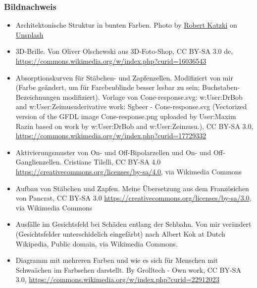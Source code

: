 \documentclass{beamer}
\begin{document}


\begin{frame}
\frametitle{Bildnachweis}
\begin{tiny}



 
\begin{itemize}

\item
Architektonische Struktur in bunten Farben. Photo by \href{https://unsplash.com/@ro_ka?utm_source=unsplash&utm_medium=referral&utm_content=creditCopyText}{Robert Katzki} on \href{https://unsplash.com/?utm_source=unsplash&utm_medium=referral&utm_content=creditCopyText}{Unsplash}
  

\item
3D-Brille. Von Oliver Olschewski aus 3D-Foto-Shop, CC BY-SA 3.0 de, \url{https://commons.wikimedia.org/w/index.php?curid=16036543}

\item
Absorptionskurven für Stäbchen- und Zapfenzellen. Modifiziert von mir (Farbe geändert, um für Farebenblinde besser lesbar zu sein; Buchstaben-Bezeichnungen modifiziert). Vorlage von Cone-response.svg: w:User:DrBob and w:User:Zeimusuderivative work: Sgbeer - Cone-response.svg (Vectorized version of the GFDL image Cone-response.png uploaded by User:Maxim Razin based on work by w:User:DrBob and w:User:Zeimusu.), CC BY-SA 3.0, \url{https://commons.wikimedia.org/w/index.php?curid=17729332}

\item
Aktivierungsmuster von On- und Off-Bipolarzellen und On- und Off-Ganglienzellen. Cristiane Tilelli, CC BY-SA 4.0 \url{https://creativecommons.org/licenses/by-sa/4.0}, via Wikimedia Commons

\item
Aufbau von Stäbchen und Zapfen. Meine Übersetzung aus dem Französichen von Pancrat, CC BY-SA 3.0 \url{https://creativecommons.org/licenses/by-sa/3.0}, via Wikimedia Commons

\item
Ausfälle im Gesichtsfeld bei Schäden entlang der Sehbahn. Von mir verändert (Gesichtsfelder unterschidelich eingefärbt) nach Albert Kok at Dutch Wikipedia, Public domain, via Wikimedia Commons. 
 
\item
Diagramm mit mehreren Farben und wie es sich für Menschen mit Schwaächen im Farbsehen darstellt. By Grolltech - Own work, CC BY-SA 3.0, \url{https://commons.wikimedia.org/w/index.php?curid=22912023}



\end{itemize}
\end{tiny}
\end{frame}
\end{document}
